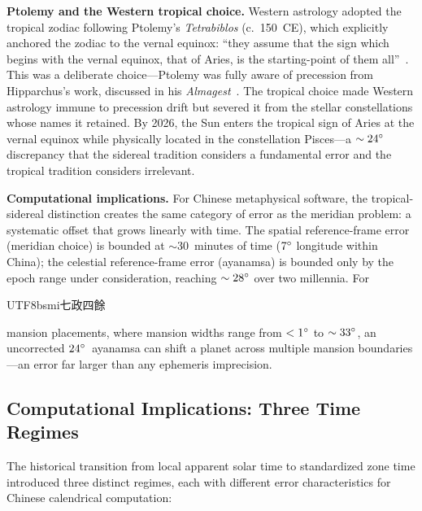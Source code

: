 \documentclass[10pt,a4paper]{article}
\newcommand{\zh}[1]{\begin{CJK}{UTF8}{bsmi}#1\end{CJK}}
\begin{document}
\textbf{Ptolemy and the Western tropical choice.}
Western astrology adopted the tropical zodiac following Ptolemy's
\textit{Tetrabiblos} (c.~150~CE), which explicitly anchored the zodiac
to the vernal equinox: ``they assume that the sign which begins with
the vernal equinox, that of Aries, is the starting-point of them
all''~\cite{ptolemy_tetrabiblos}.  This was a deliberate choice---Ptolemy
was fully aware of precession from Hipparchus's work, discussed in his
\textit{Almagest}~\cite{toomer_almagest}.  The tropical choice made
Western astrology immune to precession drift but severed it from the
stellar constellations whose names it retained.  By 2026, the Sun
enters the tropical sign of Aries at the vernal equinox while
physically located in the constellation
Pisces---a $\sim 24\degree$ discrepancy that the sidereal tradition
considers a fundamental error and the tropical tradition considers
irrelevant.

\textbf{Computational implications.}
For Chinese metaphysical software, the tropical-sidereal distinction
creates the same category of error as the meridian problem: a
systematic offset that grows linearly with time.  The spatial
reference-frame error (meridian choice) is bounded at
$\sim$30~minutes of time ($7\degree$ longitude within China); the
celestial reference-frame error (ayanamsa) is bounded only by the
epoch range under consideration, reaching $\sim 28\degree$ over two
millennia.  For \zh{七政四餘} mansion placements, where mansion widths
range from $<1\degree$ to $\sim 33\degree$, an uncorrected
$24\degree$~ayanamsa can shift a planet across multiple mansion
boundaries---an error far larger than any ephemeris imprecision.

\subsection{Computational Implications: Three Time Regimes}
\label{subsec:timeregimes}

The historical transition from local apparent solar time to standardized
zone time introduced three distinct regimes, each with different error
characteristics for Chinese calendrical computation:
\end{document}
